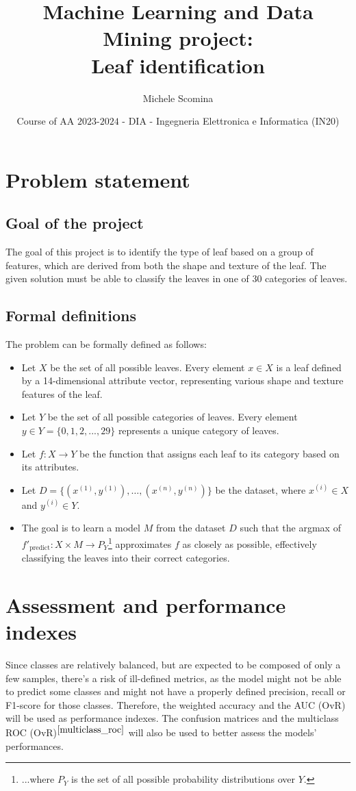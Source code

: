\documentclass{article}
\title{Machine Learning and Data Mining project:\\Leaf identification}
\author[1]{Michele Scomina}
\affil[1]{
    problem statement,
    solution design,
    solution development,
    data gathering,
    writing
}
\date{Course of AA $2023$-$2024$ - DIA - Ingegneria Elettronica e Informatica (IN20)}
\begin{document}
\maketitle



\section{Problem statement}
\subsection{Goal of the project}
The goal of this project is to identify the type of leaf based on a group of features, which are derived from both the shape and texture of the leaf.
The given solution must be able to classify the leaves in one of 30 categories of leaves.

\subsection{Formal definitions}
The problem can be formally defined as follows:
\begin{itemize}
    \item Let $X$ be the set of all possible leaves. Every element $x \in X$ is a leaf defined by a 14-dimensional attribute vector, representing various shape and texture features of the leaf.
    \item Let $Y$ be the set of all possible categories of leaves. Every element $y \in Y = \{0, 1, 2, ..., 29\}$ represents a unique category of leaves.
    \item Let $f: X \to Y$ be the function that assigns each leaf to its category based on its attributes.
    \item Let $D = \{(x^{(1)}, y^{(1)}), \ldots, (x^{(n)}, y^{(n)})\}$ be the dataset, where $x^{(i)} \in X$ and $y^{(i)} \in Y$.
    \item The goal is to learn a model $M$ from the dataset $D$ such that the argmax of $f'_{\text{predict}}: X \times M \to P_{Y}$\footnote{...where $P_{Y}$ is the set of all possible probability distributions over $Y$.} approximates $f$ as closely as possible, effectively classifying the leaves into their correct categories.
\end{itemize}


\section{Assessment and performance indexes}
Since classes are relatively balanced, but are expected to be composed of only a few samples, there's a risk of ill-defined metrics, 
as the model might not be able to predict some classes and might not have a properly defined precision, recall or F1-score for those classes.
Therefore, the weighted accuracy and the AUC (OvR) will be used as performance indexes. 
The confusion matrices and the multiclass ROC (OvR)$^{\cite{multiclass_roc}}$ will also be used to better assess the models' performances.
\end{document}
